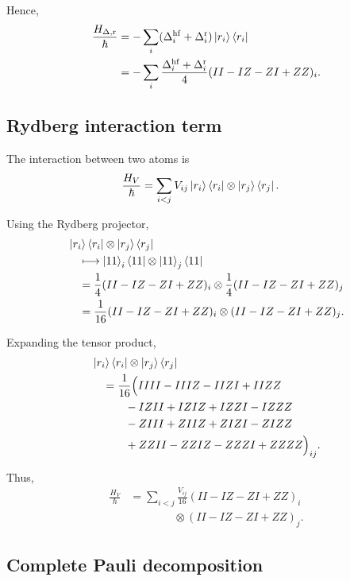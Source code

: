 \documentclass[amssymb,twocolumn,aps]{revtex4-2}
\begin{document}
Hence,
\begin{align*}
    \frac{H_{\Delta,\mathrm{r}}}{\hbar}
    &= -\sum_i
       (\Delta_i^{\mathrm{hf}}+\Delta_i^{\mathrm{r}})
       \ket{r_i}\bra{r_i}\\
    &= -\sum_i
       \frac{\Delta_i^{\mathrm{hf}}+\Delta_i^{\mathrm{r}}}{4}
       (II-IZ-ZI+ZZ)_i.
\end{align*}

\subsection*{Rydberg interaction term}

The interaction between two atoms is
\begin{align*}
    \frac{H_V}{\hbar}
    &= \sum_{i<j}V_{ij}
       \ket{r_i}\bra{r_i}
       \otimes\ket{r_j}\bra{r_j}.
\end{align*}

Using the Rydberg projector,
\begin{align*}
    &\ket{r_i}\bra{r_i}
     \otimes\ket{r_j}\bra{r_j}\\
    &\quad\longmapsto
      \ket{11}_i\bra{11}
      \otimes\ket{11}_j\bra{11}\\
    &\quad=
      \frac14(II-IZ-ZI+ZZ)_i
      \otimes
      \frac14(II-IZ-ZI+ZZ)_j\\
    &\quad=
      \frac1{16}(II-IZ-ZI+ZZ)_i
      \otimes(II-IZ-ZI+ZZ)_j.
\end{align*}

Expanding the tensor product,
\begin{align*}
    &\ket{r_i}\bra{r_i}
     \otimes\ket{r_j}\bra{r_j}\\
    &\quad=
    \frac1{16}\Big(
       IIII-IIIZ-IIZI+IIZZ\\
    &\qquad\quad
       -IZII+IZIZ+IZZI-IZZZ\\
    &\qquad\quad
       -ZIII+ZIIZ+ZIZI-ZIZZ\\
    &\qquad\quad
       +ZZII-ZZIZ-ZZZI+ZZZZ
    \Big)_{ij}.
\end{align*}

Thus,
\begin{align*}
    \frac{H_V}{\hbar}
    &= \sum_{i<j}\frac{V_{ij}}{16}
       (II-IZ-ZI+ZZ)_i\\
    &\qquad\qquad\otimes
       (II-IZ-ZI+ZZ)_j.
\end{align*}

\subsection*{Complete Pauli decomposition}
\end{document}
